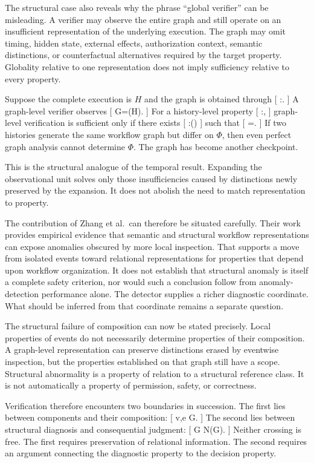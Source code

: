 \documentclass[11pt]{article}
\newcommand{\Hist}{\mathcal{H}} \newcommand{\States}{\mathcal{S}} \newcommand{\Actions}{\mathcal{A}} \newcommand{\Obs}{\mathcal{O}} \newcommand{\Img}{\operatorname{Im}}
\begin{document}
The structural case also reveals why the phrase ``global verifier'' can be misleading. A verifier may observe the entire graph and still operate on an insufficient representation of the underlying execution. The graph may omit timing, hidden state, external effects, authorization context, semantic distinctions, or counterfactual alternatives required by the target property. Globality relative to one representation does not imply sufficiency relative to every property.

Suppose the complete execution is $H$ and the graph is obtained through
[
\gamma:\Hist\rightarrow{}.
]
A graph-level verifier observes
[
G=\gamma(H).
]
For a history-level property
[
\Phi:\Hist{},
]
graph-level verification is sufficient only if there exists
[
\widehat{\Phi}:\Img(\gamma)
]
such that
[
\Phi=\widehat{\Phi}\circ\gamma.
]
If two histories generate the same workflow graph but differ on $\Phi$, then even perfect graph analysis cannot determine $\Phi$. The graph has become another checkpoint.

This is the structural analogue of the temporal result. Expanding the observational unit solves only those insufficiencies caused by distinctions newly preserved by the expansion. It does not abolish the need to match representation to property.

The contribution of Zhang et al.\ can therefore be situated carefully. Their work provides empirical evidence that semantic and structural workflow representations can expose anomalies obscured by more local inspection. That supports a move from isolated events toward relational representations for properties that depend upon workflow organization. It does not establish that structural anomaly is itself a complete safety criterion, nor would such a conclusion follow from anomaly-detection performance alone. The detector supplies a richer diagnostic coordinate. What should be inferred from that coordinate remains a separate question.

The structural failure of composition can now be stated precisely. Local properties of events do not necessarily determine properties of their composition. A graph-level representation can preserve distinctions erased by eventwise inspection, but the properties established on that graph still have a scope. Structural abnormality is a property of relation to a structural reference class. It is not automatically a property of permission, safety, or correctness.

Verification therefore encounters two boundaries in succession. The first lies between components and their composition:
[
{v,e}
\longrightarrow
G.
]
The second lies between structural diagnosis and consequential judgment:
[
G
\longrightarrow
N(G).
]
Neither crossing is free. The first requires preservation of relational information. The second requires an argument connecting the diagnostic property to the decision property.
\end{document}
